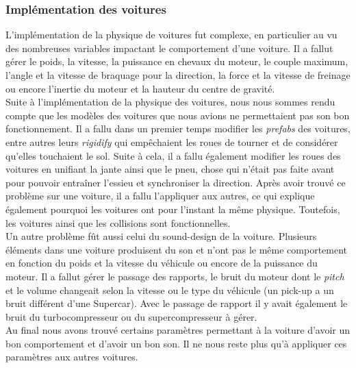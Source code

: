 \documentclass[12pt,a4paper]{article}
\begin{document}
            \subsubsection{Implémentation des voitures}
                L'implémentation de la physique de voitures fut complexe, en particulier au vu des 
                nombreuses variables impactant le comportement d'une voiture. Il a fallut gérer le 
                poids, la vitesse, la puissance en chevaux du moteur, le couple maximum, l'angle et la 
                vitesse de braquage pour la direction, la force et la vitesse de freinage ou encore 
                l'inertie du moteur et la hauteur du centre de gravité.\\
                Suite à l'implémentation de la physique des voitures, nous nous sommes rendu compte que 
                les modèles des voitures que nous avions ne permettaient pas son bon fonctionnement. Il 
                a fallu dans un premier temps modifier les \textsl{prefabs} des voitures, entre autres 
                leurs \textsl{rigidify} qui empêchaient les roues de tourner et de considérer qu'elles 
                touchaient le sol. Suite à cela, il a fallu également modifier les roues des voitures en
                unifiant la jante ainsi que le pneu, chose qui n'était pas faite avant pour pouvoir 
                entraîner l'essieu et synchroniser la direction. Après avoir trouvé ce problème sur une 
                voiture, il a fallu l'appliquer aux autres, ce qui explique également pourquoi les 
                voitures ont pour l'instant la même physique. Toutefois, les voitures ainsi que les 
                collisions sont fonctionnelles.\\
                Un autre problème fût aussi celui du sound-design de la voiture. Plusieurs éléments dans
                une voiture produisent du son et n'ont pas le même comportement en fonction du poids et
                la vitesse du véhicule ou encore de la puissance du moteur. Il a fallut gérer le passage
                des rapports, le bruit du moteur dont le \textsl{pitch} et le volume changeait selon la
                vitesse ou le type du véhicule (un pick-up a un bruit différent d'une Supercar). Avec le
                passage de rapport il y avait également le bruit du turbocompresseur ou du
                supercompresseur à gérer.\\
                Au final nous avons trouvé certains paramètres permettant à la voiture d'avoir un bon
                comportement et d'avoir un bon son. Il ne nous reste plus qu'à appliquer ces paramètres
                aux autres voitures.
\end{document}
